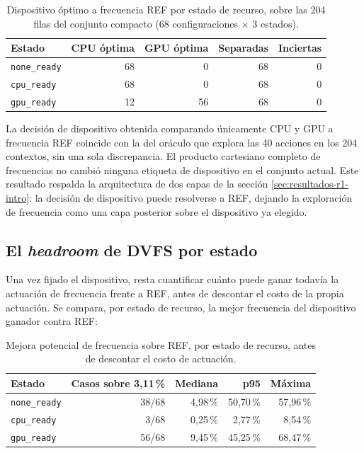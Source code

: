 \documentclass[12pt,oneside,spanish]{book}
\begin{document}
\begin{table}[H]
\centering
\caption[Coincidencia dispositivo REF vs.\ oráculo, por estado]{Dispositivo óptimo a frecuencia REF por estado de recurso, sobre las 204 filas del conjunto compacto (68 configuraciones $\times$ 3 estados).}
\label{tab:r1-dispositivo-estado}
\begin{tabular}{lrrrr}
\toprule
\textbf{Estado} & \textbf{CPU óptima} & \textbf{GPU óptima} & \textbf{Separadas} & \textbf{Inciertas} \\
\midrule
\texttt{none\_ready} & 68 & 0  & 68 & 0 \\
\texttt{cpu\_ready}  & 68 & 0  & 68 & 0 \\
\texttt{gpu\_ready}  & 12 & 56 & 68 & 0 \\
\bottomrule
\end{tabular}
\end{table}

La decisión de dispositivo obtenida comparando únicamente CPU y GPU a frecuencia REF coincide con la del oráculo que explora las 40 acciones en los 204 contextos, sin una sola discrepancia. El producto cartesiano completo de frecuencias no cambió ninguna etiqueta de dispositivo en el conjunto actual. Este resultado respalda la arquitectura de dos capas de la sección \ref{sec:resultados-r1-intro}: la decisión de dispositivo puede resolverse a REF, dejando la exploración de frecuencia como una capa posterior sobre el dispositivo ya elegido.

\subsection{El \textit{headroom} de DVFS por estado}
\label{sec:resultados-r1-headroom-dvfs}

Una vez fijado el dispositivo, resta cuantificar cuánto puede ganar todavía la actuación de frecuencia frente a REF, antes de descontar el costo de la propia actuación. Se compara, por estado de recurso, la mejor frecuencia del dispositivo ganador contra REF:

\begin{table}[H]
\centering
\caption[Headroom de frecuencia sobre REF, por estado]{Mejora potencial de frecuencia sobre REF, por estado de recurso, antes de descontar el costo de actuación.}
\label{tab:r1-headroom-dvfs}
\begin{tabular}{lrrrr}
\toprule
\textbf{Estado} & \textbf{Casos sobre 3,11\,\%} & \textbf{Mediana} & \textbf{p95} & \textbf{Máxima} \\
\midrule
\texttt{none\_ready} & 38/68 & 4,98\,\% & 50,70\,\% & 57,96\,\% \\
\texttt{cpu\_ready}  & 3/68  & 0,25\,\% & 2,77\,\%  & 8,54\,\%  \\
\texttt{gpu\_ready}  & 56/68 & 9,45\,\% & 45,25\,\% & 68,47\,\% \\
\bottomrule
\end{tabular}
\end{table}
\end{document}
